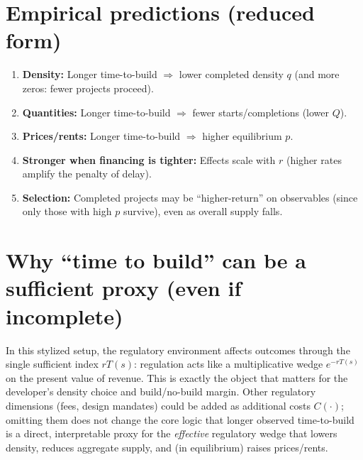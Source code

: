\documentclass[11pt]{article}
\begin{document}
\section*{Empirical predictions (reduced form)}
\begin{enumerate}
  \item \textbf{Density:} Longer time-to-build $\Rightarrow$ lower completed density $q$ (and more zeros: fewer projects proceed).
  \item \textbf{Quantities:} Longer time-to-build $\Rightarrow$ fewer starts/completions (lower $Q$).
  \item \textbf{Prices/rents:} Longer time-to-build $\Rightarrow$ higher equilibrium $p$.
  \item \textbf{Stronger when financing is tighter:} Effects scale with $r$ (higher rates amplify the penalty of delay).
  \item \textbf{Selection:} Completed projects may be ``higher-return'' on observables (since only those with high $p$ survive), even as overall supply falls.
\end{enumerate}

\section*{Why ``time to build'' can be a sufficient proxy (even if incomplete)}
In this stylized setup, the regulatory environment affects outcomes through the single sufficient index $rT(s)$: regulation acts like a multiplicative wedge $e^{-rT(s)}$ on the present value of revenue. This is exactly the object that matters for the developer's density choice and build/no-build margin. Other regulatory dimensions (fees, design mandates) could be added as additional costs $C(\cdot)$; omitting them does not change the core logic that longer observed time-to-build is a direct, interpretable proxy for the \emph{effective} regulatory wedge that lowers density, reduces aggregate supply, and (in equilibrium) raises prices/rents.
\end{document}
